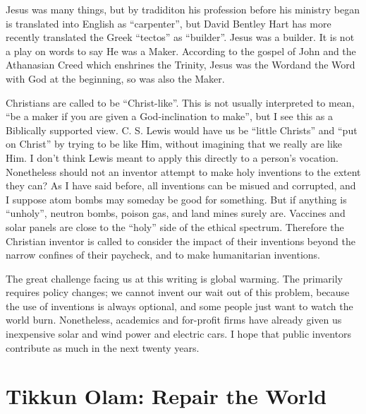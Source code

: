 \documentclass[
	fontsize=10pt, %
	twoside=false, %
	secnumdepth=1, %
]{kaobook}
\begin{document}
Jesus was many things, but by tradiditon his profession
before his ministry began is translated into English as ``carpenter'', but
David Bentley Hart has more recently translated the Greek ``tectos'' as
``builder''\cite{hart2017new}. Jesus was a builder. It is not a play on words to say
He was a Maker.
According to the gospel of John and the Athanasian Creed which enshrines
the Trinity, Jesus was the Wordand the Word with God at the beginning,
so was also the Maker.

Christians are called to be ``Christ-like''. This is not usually interpreted to mean,
``be a maker if you are given a God-inclination to make'', but I see this as
a Biblically supported view.
C. S. Lewis would have us be ``little Christs'' and ``put on Christ''
by trying to be like Him, without imagining that we really are like Him.
I don't think Lewis meant to apply this directly to a person's vocation.
Nonetheless should not an inventor attempt to make holy inventions to the
extent they can?
As I have said before, all inventions can be misued and corrupted, and
I suppose atom bombs may someday be good for something.
But if anything is ``unholy'', neutron bombs,
poison gas, and land mines surely are.
Vaccines and solar panels are close to the ``holy'' side of the ethical spectrum.
Therefore the Christian inventor is called to consider the impact of
their inventions beyond the narrow confines of their paycheck,
and to make humanitarian inventions.

The great challenge facing us at this writing is
global warming.
The primarily requires policy changes; we cannot
invent our wait out of this problem, because the
use of inventions is always optional, and some people
just want to watch the world burn.
Nonetheless, academics and for-profit firms have
already given us inexpensive solar and wind power and electric cars.
I hope that public inventors contribute as much in the next twenty years.

\section{Tikkun Olam: Repair the World}
\end{document}

